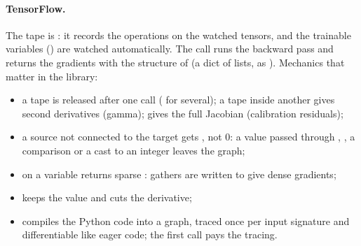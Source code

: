 \paragraph{TensorFlow.} The tape is : it records the operations on the watched tensors, and the
trainable variables () are watched automatically. The call  runs
the backward pass and returns the gradients with the structure of  (a dict of lists, as ). Mechanics that matter in the library:
\begin{itemize}[nosep]
  \item a tape is released after one  call ( for several); a tape inside another
        gives second derivatives (gamma);  gives the full Jacobian (calibration residuals);
  \item a source not connected to the target gets , not 0: a value passed through ,
        , a comparison or a cast to an integer leaves the graph;
  \item {} on a variable returns sparse : gathers are written to give dense gradients;
  \item {} keeps the value and cuts the derivative;
  \item {} compiles the Python code into a graph, traced once per input signature and differentiable
        like eager code; the first call pays the tracing.
\end{itemize}


